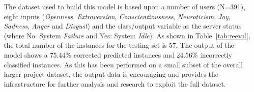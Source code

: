 \documentclass[graybox]{svmult}
\begin{document}
{{{The dataset used to build this model is based upon a number of users
(N=391), eight inputs ({\emph{Openness}}, {\emph{Extraversion}},
{\emph{Conscientiousness}}, {\emph{Neuroticism}}, {\emph{Joy}},
{\emph{Sadness}}, {\emph{Anger}} and {\emph{Disgust}}) and the
class/output variable as the server status (where No: System
{\emph{Failure}} and Yes: System {\emph{Idle}}). As shown in
Table~\ref{tab:reeval}, the total number of the instances for the
testing set is 57. The output of the model shows a 75.44\% corrected
predicted instances and 24.56\% incorrectly classified instances. As
this has been performed on a small subset of the overall larger
project dataset, the output data is encouraging and provides the
infrastructure for further analysis and research to exploit the full
dataset.




}}}
\end{document}
